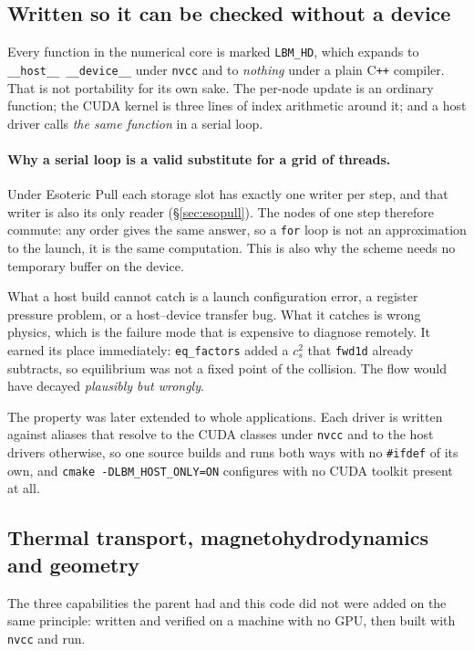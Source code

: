 \documentclass[11pt,a4paper]{article}
\newcommand{\code}[1]{\texttt{\small #1}}
\newcommand{\cs}{c_s}
\begin{document}
\subsection{Written so it can be checked without a device}
\label{sec:hostsim}

Every function in the numerical core is marked \code{LBM\_HD}, which expands to
\code{\_\_host\_\_ \_\_device\_\_} under \code{nvcc} and to \emph{nothing} under
a plain C\texttt{++} compiler. That is not portability for its own sake. The
per-node update is an ordinary function; the CUDA kernel is three lines of index
arithmetic around it; and a host driver calls \emph{the same function} in a
serial loop.

\paragraph{Why a serial loop is a valid substitute for a grid of threads.} Under
Esoteric Pull each storage slot has exactly one writer per step, and that writer
is also its only reader (\S\ref{sec:esopull}). The nodes of one step therefore
commute: any order gives the same answer, so a \code{for} loop is not an
approximation to the launch, it is the same computation. This is also why the
scheme needs no temporary buffer on the device.

What a host build cannot catch is a launch configuration error, a register
pressure problem, or a host--device transfer bug. What it catches is wrong
physics, which is the failure mode that is expensive to diagnose remotely. It
earned its place immediately: \code{eq\_factors} added a $\cs^2$ that
\code{fwd1d} already subtracts, so equilibrium was not a fixed point of the
collision. The flow would have decayed \emph{plausibly but wrongly}.

The property was later extended to whole applications. Each driver is written
against aliases that resolve to the CUDA classes under \code{nvcc} and to the
host drivers otherwise, so one source builds and runs both ways with no
\code{\#ifdef} of its own, and \code{cmake -DLBM\_HOST\_ONLY=ON} configures with
no CUDA toolkit present at all.

\subsection{Thermal transport, magnetohydrodynamics and geometry}

The three capabilities the parent had and this code did not were added on the
same principle: written and verified on a machine with no GPU, then built with
\code{nvcc} and run.
\end{document}
